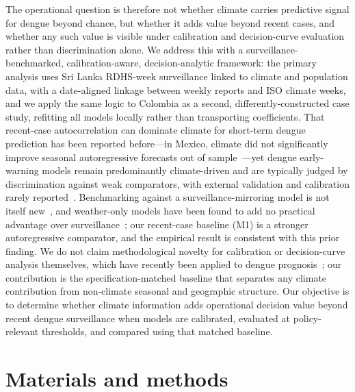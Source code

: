 \documentclass[11pt,a4paper]{article}
\begin{document}
The operational question is therefore not whether climate carries predictive signal for dengue beyond chance, but whether it adds value beyond recent cases, and whether any such value is visible under calibration and decision-curve evaluation rather than discrimination alone. We address this with a surveillance-benchmarked, calibration-aware, decision-analytic framework: the primary analysis uses Sri Lanka RDHS-week surveillance linked to climate and population data, with a date-aligned linkage between weekly reports and ISO climate weeks, and we apply the same logic to Colombia as a second, differently-constructed case study, refitting all models locally rather than transporting coefficients. That recent-case autocorrelation can dominate climate for short-term dengue prediction has been reported before---in Mexico, climate did not significantly improve seasonal autoregressive forecasts out of sample~\cite{Johansson2016}---yet dengue early-warning models remain predominantly climate-driven and are typically judged by discrimination against weak comparators, with external validation and calibration rarely reported~\cite{Leung2022,HussainAlkhateeb2021}. Benchmarking against a surveillance-mirroring model is not itself new~\cite{Lowe2013}, and weather-only models have been found to add no practical advantage over surveillance~\cite{Benedum2020}; our recent-case baseline (M1) is a stronger autoregressive comparator, and the empirical result is consistent with this prior finding. We do not claim methodological novelty for calibration or decision-curve analysis themselves, which have recently been applied to dengue prognosis~\cite{Sangkaew2026}; our contribution is the specification-matched baseline that separates any climate contribution from non-climate seasonal and geographic structure. Our objective is to determine whether climate information adds operational decision value beyond recent dengue surveillance when models are calibrated, evaluated at policy-relevant thresholds, and compared using that matched baseline.

\section{Materials and methods}
\end{document}
